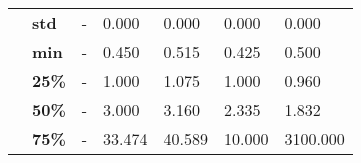 \begin{tabularx}{\linewidth}{lXXXXXX}
      & \textbf{std} &             - &      0.000 &       0.000 &              0.000 &     0.000 \\
      & \textbf{min} &             - &      0.450 &       0.515 &              0.425 &     0.500 \\
      & \textbf{25\%} &             - &      1.000 &       1.075 &              1.000 &     0.960 \\
      & \textbf{50\%} &             - &      3.000 &       3.160 &              2.335 &     1.832 \\
      & \textbf{75\%} &             - &     33.474 &      40.589 &             10.000 &  3100.000 \\
\bottomrule
\end{tabularx}
